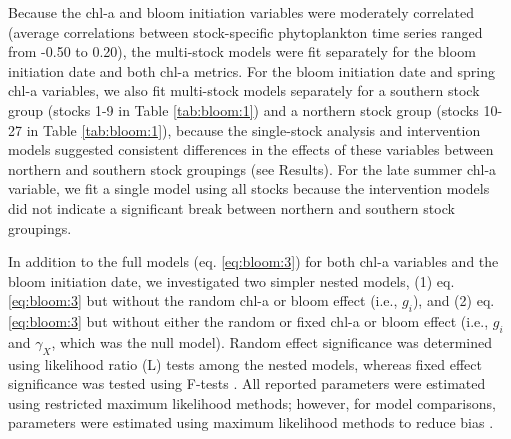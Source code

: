 Because the chl-a and bloom initiation variables were moderately correlated
(average correlations between stock-specific phytoplankton time series ranged
from -0.50 to 0.20), the multi-stock models were fit separately for the bloom
initiation date and both chl-a metrics. For the bloom initiation date and spring
chl-a variables, we also fit multi-stock models separately for a southern stock
group (stocks 1-9 in Table \ref{tab:bloom:1}) and a northern stock group (stocks
10-27 in Table \ref{tab:bloom:1}), because the single-stock analysis and
intervention models suggested consistent differences in the effects of these
variables between northern and southern stock groupings (see Results). For the
late summer chl-a variable, we fit a single model using all stocks because the
intervention models did not indicate a significant break between northern and
southern stock groupings.

In addition to the full models (eq. \ref{eq:bloom:3}) for both chl-a variables
and the bloom initiation date, we investigated two simpler nested models, (1)
eq. \ref{eq:bloom:3} but without the random chl-a or bloom effect (i.e.,
\(g_{i}\)), and (2) eq. \ref{eq:bloom:3} but without either the random or fixed
chl-a or bloom effect (i.e., \(g_{i}\) and \(\gamma_{X}\), which was the null
model).  Random effect significance was determined using likelihood ratio (L)
tests among the nested models, whereas fixed effect significance was tested
using F-tests \citep{Pinheiro2000a}. All reported parameters were estimated
using restricted maximum likelihood methods; however, for model comparisons,
parameters were estimated using maximum likelihood methods to reduce bias
\citep{Pinheiro2000a}.


